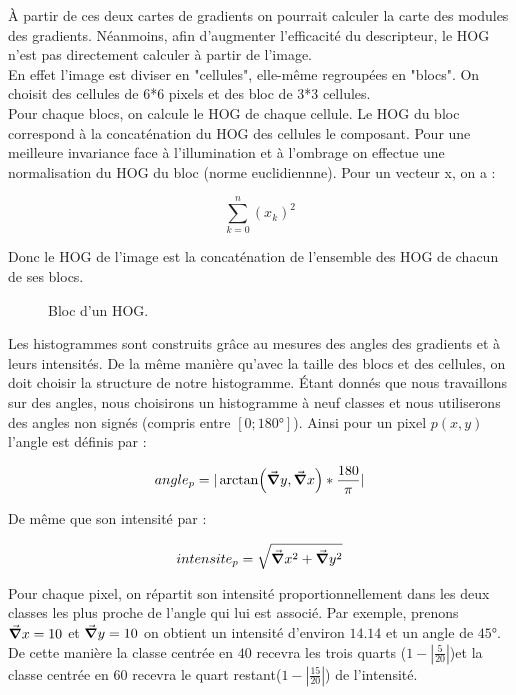 À partir de ces deux cartes de gradients on pourrait calculer la carte des modules des gradients. Néanmoins, afin d'augmenter l'efficacité du descripteur, le HOG n'est pas directement calculer à partir de l'image.\\

En effet l'image est diviser en "cellules", elle-même regroupées en "blocs". On choisit des cellules de 6*6 pixels et des bloc de 3*3 cellules.\\

Pour chaque blocs, on calcule le HOG de chaque cellule. Le HOG du bloc correspond à la concaténation du HOG des cellules le composant. Pour une meilleure invariance face à l'illumination et à l'ombrage on effectue une normalisation du HOG du bloc (norme euclidiennne). Pour un vecteur x, on a :

\[ \sum_{k=0}^{n} (x_{k})^{2} \]

Donc le HOG de l'image est la concaténation de l'ensemble des HOG de chacun de ses blocs.

\begin{figure}[!htbp]
\center
\caption{Bloc d'un HOG.}
\label{fig:cuttlefish_bloccells}
\end{figure}

Les histogrammes sont construits grâce au mesures des angles des gradients et à leurs intensités. De la même manière qu'avec la taille des blocs et des cellules, on doit choisir la structure de notre histogramme. Étant donnés que nous travaillons sur des angles, nous choisirons un histogramme à neuf classes et nous utiliserons des angles non signés (compris entre $[0; 180°]$).
Ainsi pour un pixel $p(x,y)$ l'angle est définis par :

\[ angle_{p} = |\arctan (\grad y, \grad x)*\frac{180}{\pi}| \]

De même que son intensité par :

\[ intensite_{p} = \sqrt{\grad x^{2} + \grad y^{2}} \]

Pour chaque pixel, on répartit son intensité proportionnellement dans les deux classes les plus proche de l'angle qui lui est associé. 
Par exemple, prenons $\grad x = 10$ et $\grad y = 10$ on obtient un intensité d'environ $14.14$ et un angle de $45°$. De cette manière la classe centrée en $40$ recevra les trois quarts ($1 - |\frac{5}{20}|$)et la classe centrée en $60$ recevra le quart restant($1 - |\frac{15}{20}|$) de l'intensité.\\

